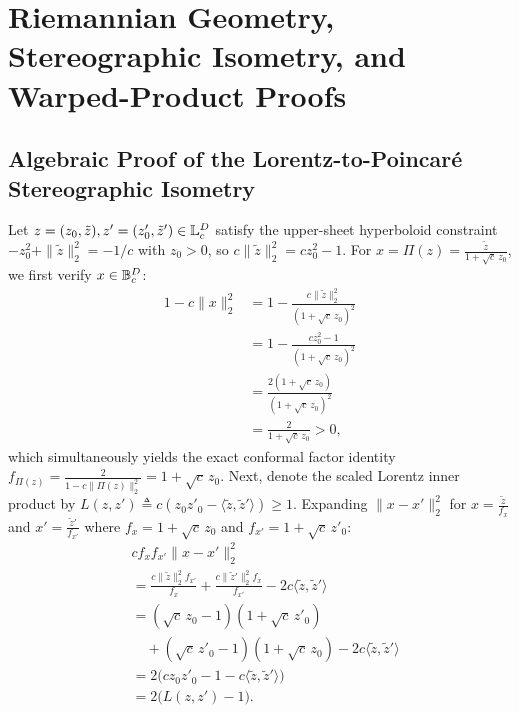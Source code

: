 
\section{Riemannian Geometry, Stereographic Isometry, and Warped-Product Proofs}
\label{app:warped_product}

\subsection{Algebraic Proof of the Lorentz-to-Poincar\'e Stereographic Isometry}
Let $z = (z_0, \tilde{z}), z' = (z'_0, \tilde{z}') \in \mathbb{L}_c^D$ satisfy the upper-sheet hyperboloid constraint $-z_0^2 + \|\tilde{z}\|_2^2 = -1/c$ with $z_0 > 0$, so $c\|\tilde{z}\|_2^2 = c z_0^2 - 1$.
For $x = \Pi(z) = \frac{\tilde{z}}{1 + \sqrt{c}\,z_0}$, we first verify $x \in \mathbb{B}_c^D$:
\begin{equation}
  \begin{aligned}
    1 - c\|x\|_2^2
    &= 1 - \frac{c\|\tilde{z}\|_2^2}{(1 + \sqrt{c}\,z_0)^2} \\
    &= 1 - \frac{c z_0^2 - 1}{(1 + \sqrt{c}\,z_0)^2} \\
    &= \frac{2(1 + \sqrt{c}\,z_0)}{(1 + \sqrt{c}\,z_0)^2} \\
    &= \frac{2}{1 + \sqrt{c}\,z_0} > 0,
  \end{aligned}
  \label{eq:app_conformal_lorentz}
\end{equation}
which simultaneously yields the exact conformal factor identity $f_{\Pi(z)} = \frac{2}{1 - c\|\Pi(z)\|_2^2} = 1 + \sqrt{c}\,z_0$.
Next, denote the scaled {Lorentz} inner product by $L(z, z') \triangleq c(z_0 z'_0 - \langle \tilde{z}, \tilde{z}'\rangle) \ge 1$.
Expanding $\|x - x'\|_2^2$ for $x = \frac{\tilde{z}}{f_x}$ and $x' = \frac{\tilde{z}'}{f_{x'}}$ where $f_x = 1 + \sqrt{c}\,z_0$ and $f_{x'} = 1 + \sqrt{c}\,z'_0$:
\begin{equation}
  \begin{aligned}
    &c f_x f_{x'}\|x - x'\|_2^2 \\
    &= \frac{c\|\tilde{z}\|_2^2 f_{x'}}{f_x} + \frac{c\|\tilde{z}'\|_2^2 f_x}{f_{x'}}
      - 2c\langle \tilde{z}, \tilde{z}'\rangle \\
    &= (\sqrt{c}\,z_0 - 1)(1 + \sqrt{c}\,z'_0) \\
    &\quad+ (\sqrt{c}\,z'_0 - 1)(1 + \sqrt{c}\,z_0)
      - 2c\langle \tilde{z}, \tilde{z}'\rangle \\
    &= 2\bigl(c z_0 z'_0 - 1 - c\langle \tilde{z}, \tilde{z}'\rangle\bigr) \\
    &= 2\bigl(L(z, z') - 1\bigr).
  \end{aligned}
\end{equation}
